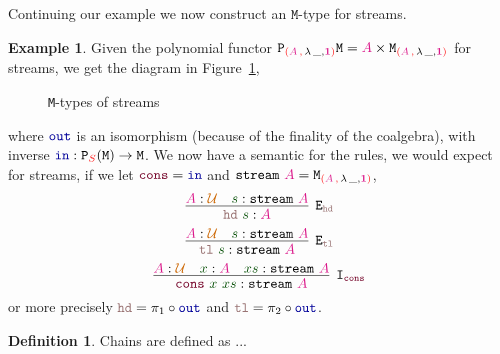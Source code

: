 \documentclass[twoside,11pt,openright]{report}
\theoremstyle{plain} %
\theoremstyle{definition}
\newtheorem{defn}{Definition}[section]
\newtheorem{exmp}{Example}[section]
\theoremstyle{remark}
\newcommand*{\figref}[1]{Figure~\ref{fig:#1}}
\newcommand*{\term}[1]{\textcolor{green!30!black}{#1}} %
\newcommand*{\type}[1]{\textcolor{magenta!90!black}{#1}}
\newcommand*{\container}[1]{\textcolor{red}{#1}}
\newcommand*{\containerpair}[2]{\textcolor{red}{(}#1\,\textcolor{red}{,}\,#2\textcolor{red}{)}}
\newcommand*{\universe}[1]{\textcolor{orange!80!black}{#1}}
\newcommand*{\unit}{\type{\textbf{1}}}
\newcommand*{\function}[1]{\textcolor{blue!60!black}{\ensuremath{\mathtt{#1}}}}
\newcommand*{\constructor}[1]{\textcolor{purple!60!black}{\ensuremath{\mathtt{#1}}}}
\newcommand*{\destructor}[1]{\textcolor{pink!60!black}{\ensuremath{\mathtt{#1}}}}
\newcommand*{\typeformer}[1]{\ensuremath{\mathtt{#1}}}
\newcommand*{\functor}[1]{\ensuremath{\mathbf{\mathtt{#1}}}}
\begin{document}
\noindent Continuing our example we now construct an \(\mathtt{M}\)-type for streams.
\begin{exmp} Given the polynomial functor \(\functor{P}_{\containerpair{\type{A}}{\lambda\,\_,\unit}} \typeformer{M} = \type{A} \times \typeformer{M}_{\containerpair{\type{A}}{\lambda\,\_,\unit}}\) for streams, we get the diagram in \figref{stream-M-type},
  \begin{figure}[h]
    \centering
    \caption{\texttt{M}-types of streams}
    \label{fig:stream-M-type}
  \end{figure}
  where \(\function{out}\) is an isomorphism (because of the finality of the coalgebra), with inverse \(\function{in} : \functor{P}_{\container{S}}(\typeformer{M}) \rightarrow \typeformer{M}\). We now have a semantic for the rules, we would expect for streams, if we let \(\constructor{cons} = \function{in}\) and \(\typeformer{stream}~\type{A} = \typeformer{M}_{\containerpair{\type{A}}{\lambda\,\_,\unit}}\),
  \begin{equation}
    \infer[\mathtt{E}_{\destructor{hd}}]{\destructor{hd}~\term{s} : \type{A}}{\type{A} : \universe{\mathcal{U}} & \term{s} : \typeformer{stream}~\type{A}}
  \end{equation}
  \begin{equation}
    \infer[\mathtt{E}_{\destructor{tl}}]{\destructor{tl}~\term{s} : \typeformer{stream}~\type{A}}{\type{A} : \universe{\mathcal{U}} & \term{s} : \typeformer{stream}~\type{A}}
  \end{equation}
  \begin{equation}
    \infer[\mathtt{I}_{\constructor{cons}}]{\term{\constructor{cons}}~\term{x}~\term{xs} : \typeformer{stream}~\type{A}}{\type{A} : \universe{\mathcal{U}} & \term{x} : \type{A} & \term{xs} : \typeformer{stream}~\type{A}}
  \end{equation}
  or more precisely \(\destructor{hd} = \pi_1 \circ \function{out}\) and \(\destructor{tl} = \pi_2 \circ \function{out}\).
\end{exmp}
\begin{defn}
  Chains are defined as ... \todo[inline]{define chains, \(\function{\pi}_{(n)}\) and \(\type{X}_n\)}
\end{defn}
\end{document}
